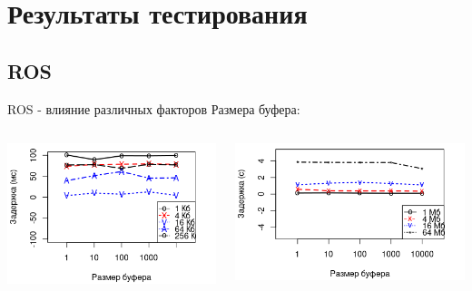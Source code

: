 \section{Результаты тестирования}

\subsection{ROS}
\begin{frame}{ROS - влияние различных факторов}
	Размера буфера:
	\begin{columns}[onlytextwidth]
		\begin{column}{0.45\textwidth}
			\includegraphics[width=\textwidth]{img/ros/ros_buf_l_k.png}
		\end{column}
		\begin{column}{0.45\textwidth}
			\includegraphics[width=\textwidth]{img/ros/ros_buf_l_m.png}
		\end{column}
	\end{columns}
	

\end{frame}

